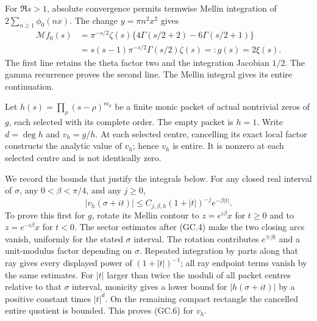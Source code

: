 \documentclass[11pt,a4paper]{article}
\begin{document}
For $\Re s>1$, absolute convergence permits termwise Mellin integration
of $2\sum_{n\ge1}\phi_0(nx)$. The change $y=\pi n^2x^2$ gives
\[
 \begin{split}
 \mathcal Mf_0(s)
 &=\pi^{-s/2}\zeta(s)
       \{4\Gamma(s/2+2)-6\Gamma(s/2+1)\}\\
 &=s(s-1)\pi^{-s/2}\Gamma(s/2)\zeta(s)=:g(s)=2\xi(s).
 \end{split}                                                   \tag{GC.5}
\]
The first line retains the theta factor two and the integration
Jacobian $1/2$. The gamma recurrence proves the second line. The
Mellin integral gives its entire continuation.

Let $h(s)=\prod_\rho(s-\rho)^{m_\rho}$ be a finite monic packet of
actual nontrivial zeros of $g$, each selected with its complete order.
The empty packet is $h=1$. Write $d=\deg h$ and $v_h=g/h$.
At each selected centre, cancelling its exact local factor constructs
the analytic value of $v_h$; hence $v_h$ is entire. It is nonzero at
each selected centre and is not identically zero.

We record the bounds that justify the integrals below. For any closed
real interval of $\sigma$, any $0<\beta<\pi/4$, and any $j\ge0$,
\[
 |v_h(\sigma+it)|\le C_{j,\beta,h}(1+|t|)^{-j}e^{-\beta|t|}.
                                                               \tag{GC.6}
\]
To prove this first for $g$, rotate its Mellin contour to
$z=e^{i\beta}x$ for $t\ge0$ and to $z=e^{-i\beta}x$ for $t<0$.
The sector estimates after (GC.4) make the two closing arcs vanish,
uniformly for the stated $\sigma$ interval. The rotation contributes
$e^{\mp\beta t}$ and a unit-modulus factor depending on $\sigma$.
Repeated integration by parts along that ray gives every displayed
power of $(1+|t|)^{-1}$; all ray endpoint terms vanish by the same
estimates. For $|t|$ larger than twice the moduli of all packet
centres relative to that $\sigma$ interval, monicity gives a lower
bound for $|h(\sigma+it)|$ by a positive constant times $|t|^d$.
On the remaining compact rectangle the cancelled entire quotient is
bounded. This proves (GC.6) for $v_h$.
\end{document}
